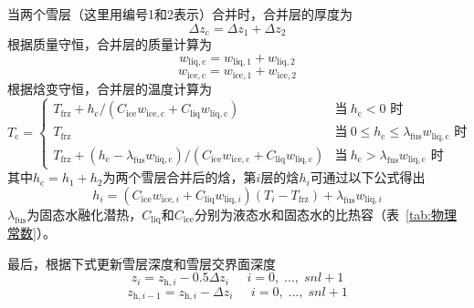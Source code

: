 当两个雪层（这里用编号1和2表示）合并时，合并层的厚度为
\begin{equation}\label{eq:SnowCombThick}
  \Delta {z}_{\mathrm {c}} =\Delta {z}_{1}+\Delta {z}_{2}
\end{equation}
根据质量守恒，合并层的质量计算为
\begin{equation}
  w_{\mathrm{liq,c}}=w_{\mathrm{liq,1}}+w_{\mathrm{liq,2}}
\end{equation}
\begin{equation}
  w_{\mathrm{ice,c}}=w_{\mathrm{ice,1}}+w_{\mathrm{ice,2}}
\end{equation}
根据焓变守恒，合并层的温度计算为
\begin{equation}\label{eq:SnowCombTemp}
  T_{\mathrm {c}} =\begin{cases}
    T_{\mathrm {frz}} +{h_{\mathrm {c}} }/\left(C_{\mathrm{ice}}w_{\mathrm{ice,c}}+C_{\mathrm{liq}}w_{\mathrm{liq,c}}\right) &\text{当}\ h_{\mathrm {c}} <0 \text{ 时} \\
    T_{\mathrm {frz}}  &\text{当}\ 0 \leqslant h_{\mathrm {c}}  \leqslant \lambda_{\mathrm {fus}}  w_{\mathrm{liq,c}} \text{ 时}\\
    T_{\mathrm {frz}} +\left(h_{\mathrm {c}} -\lambda_{\mathrm {fus}}  w_{\mathrm{liq,c}}\right)/\left(C_{\mathrm{ice}} w_{\mathrm{ice,c}}+C_{\mathrm{liq}} w_{\mathrm{liq,c}}\right) &\text{当}\ h_{\mathrm {c}}  > \lambda_{\mathrm {fus}}  w_{\mathrm{liq,c}} \text{ 时}
  \end{cases}
\end{equation}
其中$h_{\mathrm {c}} =h_1+h_2$为两个雪层合并后的焓，第$i$层的焓$h_i$可通过以下公式得出
\begin{equation}
  h_i=\left(C_{\mathrm{ice}}w_{\mathrm{ice},i}+C_{\mathrm{liq}}w_{\mathrm{liq},i}\right)\left(T_i-T_{\mathrm {frz}} \right)+\lambda_{\mathrm {fus}}w_{\mathrm{liq},i}
\end{equation}
$\lambda_{\mathrm {fus}} $为固态水融化潜热，$C_{\mathrm{liq}}$和$C_{\mathrm{ice}}$分别为液态水和固态水的比热容（表~\ref{tab:物理常数}）。

最后，根据下式更新雪层深度和雪层交界面深度
\begin{equation}
  z_i=z_{\mathrm{h},i}-0.5\Delta z_i \;\;\;\;\;i=0,\;...,\;snl+1
\end{equation}
\begin{equation}
  z_{\mathrm{h},i-1}=z_{\mathrm{h},i}-\Delta z_i \;\;\;\;\;i=0,\;...,\;snl+1
\end{equation}



